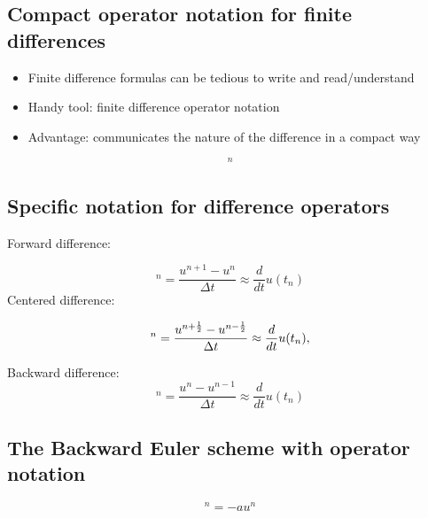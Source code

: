 \documentclass[%
oneside,                 %
final,                   %
10pt]{article}
\begin{document}
\noindent
\subsection*{Compact operator notation for finite differences}
\label{decay:fd:op}

 

\begin{itemize}
 \item Finite difference formulas can be tedious to write and read/understand

 \item Handy tool: finite difference operator notation

 \item Advantage: communicates the nature of the difference in a compact way
\end{itemize}

\noindent
\begin{equation}
[D_t^- u  = -au]^n
\end{equation}

\subsection*{Specific notation for difference operators}

Forward difference:

\begin{equation}
[D_t^+u]^n = \frac{u^{n+1} - u^{n}}{\Delta t}
\approx \frac{d}{dt} u(t_n) \label{fd:D:f}
\end{equation}
Centered difference:

\begin{equation}
[D_tu]^n = \frac{u^{n+\half} - u^{n-\half}}{\Delta t}
\approx \frac{d}{dt} u(t_n), \label{fd:D:c}
\end{equation}

Backward difference:
\begin{equation}
[D_t^-u]^n = \frac{u^{n} - u^{n-1}}{\Delta t}
\approx \frac{d}{dt} u(t_n) \label{fd:D:b}
\end{equation}

\subsection*{The Backward Euler scheme with operator notation}

\begin{equation*}
[D_t^-u]^n = -au^n
\end{equation*}
\end{document}
